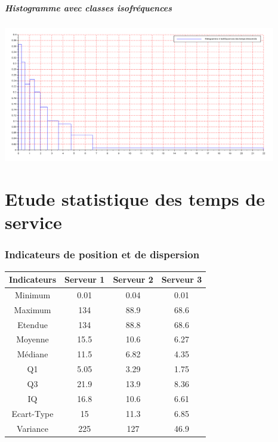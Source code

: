 \documentclass{article}
\begin{document}
\subsubsection{Histogramme avec classes isofréquences}
\begin{center}
\includegraphics[width=450px]{img/H_isof.png}
\end{center}
\paragraph{}

\part{Etude statistique des temps de service}

\section{Indicateurs de position et de dispersion}

\begin{tabular}{|c|c|c|c|}
  \hline
  Indicateurs & Serveur 1 & Serveur 2 & Serveur 3 \\
  \hline
  Minimum & 0.01 & 0.04 & 0.01 \\
  Maximum & 134 & 88.9 & 68.6 \\
  Etendue & 134 & 88.8 & 68.6 \\
  Moyenne & 15.5 & 10.6 & 6.27 \\
  Médiane & 11.5 & 6.82 & 4.35 \\
  Q1 & 5.05 & 3.29 & 1.75 \\
  Q3 & 21.9 & 13.9 & 8.36 \\
  IQ & 16.8 & 10.6 & 6.61 \\
  Ecart-Type & 15 & 11.3 & 6.85 \\
  Variance & 225 & 127 & 46.9 \\
  \hline
\end{tabular}
\end{document}

